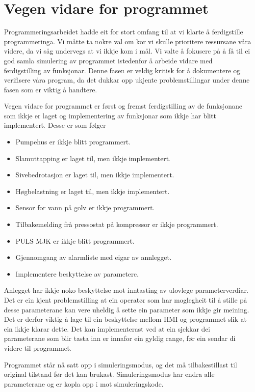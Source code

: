 \section{Vegen vidare for programmet}
\thispagestyle{fancy}

Programmeringsarbeidet hadde eit for stort omfang til at vi klarte å ferdigstille programmeringa. 
Vi måtte ta nokre val om kor vi skulle prioritere ressursane våra videre, da vi såg undervegs at vi ikkje kom i mål. 
Vi valte å fokusere på å få til ei god samla simulering av programmet istedenfor å arbeide vidare med ferdigstilling av funksjonar.
Denne fasen er veldig kritisk for å dokumentere og verifisere våra program, da det dukkar opp ukjente problemstillingar under denne fasen som er viktig å handtere.

Vegen vidare for programmet er først og fremst ferdigstilling av de funksjonane som ikkje er laget og implementering av funksjonar som ikkje har blitt implementert. 
Desse er som følger

\begin{itemize}
    \item Pumpehus er ikkje blitt programmert. 
    \item Slamuttapping er laget til, men ikkje implementert.
    \item Sivebedrotasjon er laget til, men ikkje implementert.
    \item Høgbelastning er laget til, men ikkje implementert.
    \item Sensor for vann på golv er ikkje programmert.
    \item Tilbakemelding frå pressostat på kompressor er ikkje programmert.
    \item PULS MJK er ikkje blitt programmert.
    \item Gjennomgang av alarmliste med eigar av annlegget.
    \item Implementere beskyttelse av parametere.
\end{itemize}

Anlegget har ikkje noko beskyttelse mot inntasting av ulovlege parameterverdiar.
Det er ein kjent problemstilling at ein operatør som har moglegheit til å stille på desse parameterane kan vere uheldig å sette ein parameter som ikkje gir meining. 
Det er derfor viktig å lage til ein beskyttelse mellom HMI og programmet slik at ein ikkje klarar dette. 
Det kan implementerast ved at ein sjekkar dei parameterane som blir tasta inn er innafor ein gyldig range, før ein sendar di videre til programmet. 

Programmet står nå satt opp i simuleringsmodus, og det må tilbakestillast til original tilstand før det kan brukast. 
Simuleringsmodus har endra alle parameterane og er kopla opp i mot simuleringskode.  

\newpage